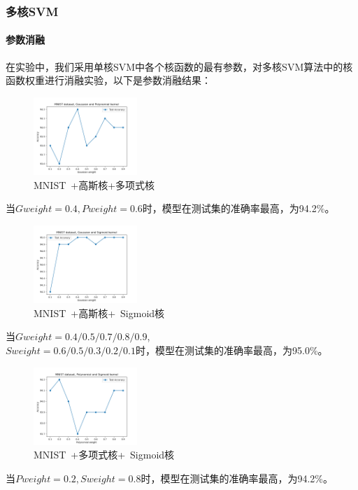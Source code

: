 \documentclass[a4paper]{article}
\begin{document}
\subsubsection{多核SVM}
\paragraph*{参数消融}
在实验中，我们采用单核SVM中各个核函数的最有参数，对多核SVM算法中的核函数权重进行消融实验，以下是参数消融结果：

\begin{figure}[H]
    \centering
    \includegraphics[width=0.35\textwidth]{pictures/multi kernel/MNIST+高斯核+多项式核.png}
    \caption{MNIST\ +高斯核+多项式核}
\end{figure}
当$Gweight=0.4, Pweight=0.6$时，模型在测试集的准确率最高，为94.2\%。

\begin{figure}[H]
    \centering
    \includegraphics[width=0.35\textwidth]{pictures/multi kernel/MNIST+高斯核+sigmoid核.png}
    \caption{MNIST\ +高斯核+\ Sigmoid核} 
\end{figure}
当$Gweight=0.4/0.5/0.7/0.8/0.9$, \\$Sweight=0.6/0.5/0.3/0.2/0.1$时，模型在测试集的准确率最高，为95.0\%。

\begin{figure}[H]
    \centering
    \includegraphics[width=0.35\textwidth]{pictures/multi kernel/MNIST+多项式核+sigmoid核.png}
    \caption{MNIST\ +多项式核+\ Sigmoid核}
\end{figure}
当$Pweight=0.2, Sweight=0.8$时，模型在测试集的准确率最高，为94.2\%。
\end{document}
